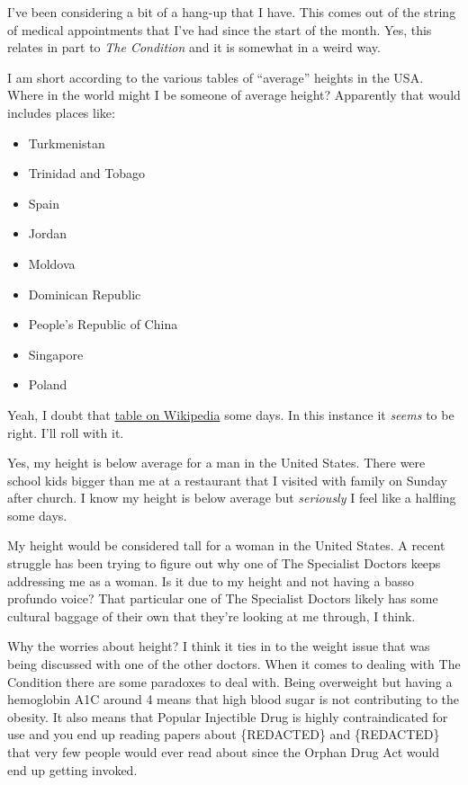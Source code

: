 I've been considering a bit of a hang-up that I have. This comes out of
the string of medical appointments that I've had since the start of the
month. Yes, this relates in part to \emph{The Condition} and it is
somewhat in a weird way.

I am short according to the various tables of ``average'' heights in the
USA. Where in the world might I be someone of average height? Apparently
that would includes places like:

\begin{itemize}
\tightlist
\item
  Turkmenistan
\item
  Trinidad and Tobago
\item
  Spain
\item
  Jordan
\item
  Moldova
\item
  Dominican Republic
\item
  People's Republic of China
\item
  Singapore
\item
  Poland
\end{itemize}

Yeah, I doubt that
\href{https://en.wikipedia.org/w/index.php?title=Average_human_height_by_country&oldid=1217241037}{table
on Wikipedia} some days. In this instance it \emph{seems} to be right.
I'll roll with it.

Yes, my height is below average for a man in the United States. There
were school kids bigger than me at a restaurant that I visited with
family on Sunday after church. I know my height is below average but
\emph{seriously} I feel like a halfling some days.

My height would be considered tall for a woman in the United States. A
recent struggle has been trying to figure out why one of The Specialist
Doctors keeps addressing me as a woman. Is it due to my height and not
having a basso profundo voice? That particular one of The Specialist
Doctors likely has some cultural baggage of their own that they're
looking at me through, I think.

Why the worries about height? I think it ties in to the weight issue
that was being discussed with one of the other doctors. When it comes to
dealing with The Condition there are some paradoxes to deal with. Being
overweight but having a hemoglobin A1C around 4 means that high blood
sugar is not contributing to the obesity. It also means that Popular
Injectible Drug is highly contraindicated for use and you end up reading
papers about \{REDACTED\} and \{REDACTED\} that very few people would
ever read about since the Orphan Drug Act would end up getting invoked.

